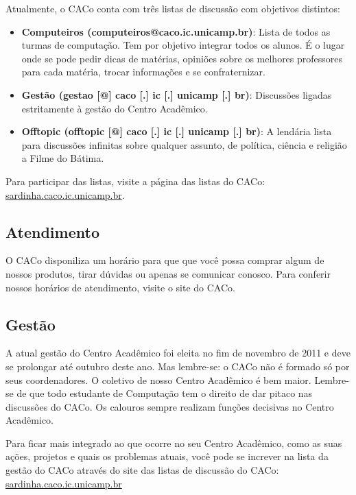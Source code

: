 Atualmente, o CACo conta com três listas de discussão com objetivos distintos:

\begin{itemize}
\item  \textbf{Computeiros (computeiros@caco.ic.unicamp.br)}: Lista de todos as turmas de computação. Tem por objetivo integrar todos os alunos. É o lugar onde se pode pedir dicas de matérias, opiniões sobre os melhores professores para cada matéria, trocar informações e se confraternizar.
\end{itemize}

\begin{itemize}
\item  \textbf{Gestão (gestao [@] caco [.] ic [.] unicamp [.] br)}: Discussões ligadas estritamente à gestão do Centro Acadêmico.
\end{itemize}

\begin{itemize}
\item  \textbf{Offtopic (offtopic [@] caco [.] ic [.] unicamp [.] br)}: A lendária lista para discussões infinitas sobre qualquer assunto, de política, ciência e religião a Filme do Bátima.
\end{itemize}

Para participar das listas, visite a página das listas do CACo:
\url{sardinha.caco.ic.unicamp.br}.

\subsection{Atendimento}

O CACo disponiliza um horário para que que você possa comprar algum de nossos
produtos, tirar dúvidas ou apenas se comunicar conosco. Para conferir nossos
horários de atendimento, visite o site do CACo.


\subsection{Gestão}

A atual gestão do Centro Acadêmico foi eleita no fim de novembro de 2011 e deve
se prolongar até outubro deste ano. Mas lembre-se: o CACo não é formado só por
seus coordenadores. O coletivo de nosso Centro Acadêmico é bem maior. Lembre-se
de que todo estudante de Computação tem o direito de dar pitaco nas discussões
do CACo. Os calouros sempre realizam funções decisivas no Centro Acadêmico.

Para ficar mais integrado ao que ocorre no seu Centro Acadêmico, como as suas
ações, projetos e quais os problemas atuais, você pode se increver na lista da
gestão do CACo através do site das listas de discussão do CACo:
\url{sardinha.caco.ic.unicamp.br}

